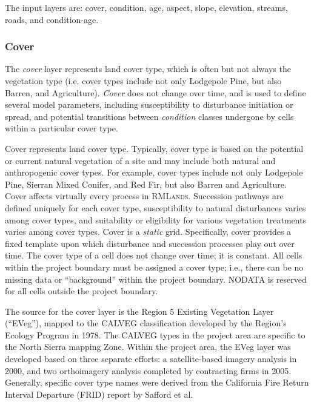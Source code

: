 The input layers are: cover, condition, age, aspect, slope, elevation, streams, roads, and condition-age.


\subsubsection{Cover} The \emph{cover} layer represents land cover type, which is often but not always the vegetation type (i.e. cover types include not only Lodgepole Pine, but also Barren, and Agriculture). \emph{Cover} does not change over time, and is used to define several model parameters, including susceptibility to disturbance initiation or spread, and potential transitions between \emph{condition} classes undergone by cells within a particular cover type.

Cover represents land cover type. Typically, cover type is based on the potential or current natural vegetation of a site and may include both natural and anthropogenic cover types. For example, cover types include not only Lodgepole Pine, Sierran Mixed Conifer, and Red Fir, but also Barren and Agriculture. Cover affects virtually every process in \textsc{RMLands}. Succession pathways are defined uniquely for each cover type, susceptibility to natural disturbances varies among cover types, and suitability or eligibility for various vegetation treatments varies among cover types. Cover is a \emph{static} grid. Specifically, cover provides a fixed template upon which disturbance and succession processes play out over time. The cover type of a cell does not change over time; it is constant. All cells within the project boundary must be assigned a cover type; i.e., there can be no missing data or ``background'' within the project boundary. NODATA is reserved for all cells outside the project boundary.

The source for the cover layer is the Region 5 Existing Vegetation Layer (``EVeg''), mapped to the CALVEG classification developed by the Region's Ecology Program in 1978. The CALVEG types in the project area are specific to the North Sierra mapping Zone. Within the project area, the EVeg layer was developed based on three separate efforts: a satellite-based imagery analysis in 2000, and two orthoimagery analysis completed by contracting firms in 2005. Generally, specific cover type names were derived from the California Fire Return Interval Departure (FRID) report by Safford et al. 

